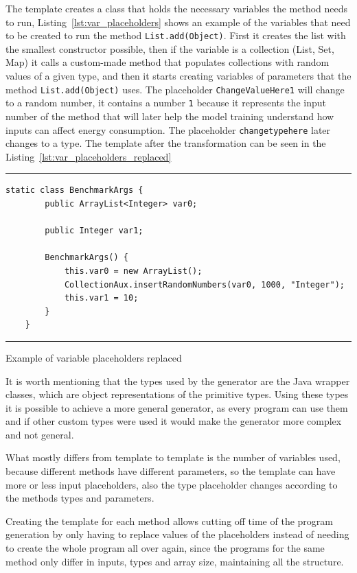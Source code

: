 The template creates a class that holds the necessary variables the method needs to run, Listing~\ref{lst:var_placeholders} shows an example of the variables that need to be created to run the method \texttt{List.add(Object)}. First it creates the list with the smallest constructor possible, then if the variable is a collection (List, Set, Map) it calls a custom-made method that populates collections with random values of a given type, and then it starts creating variables of parameters that the method \texttt{List.add(Object)} uses. The placeholder \texttt{ChangeValueHere1} will change to a random number, it contains a number \texttt{1} because it represents the input number of the method that will later help the model training understand how inputs can affect energy consumption. The placeholder \texttt{changetypehere} later changes to a type. The template after the transformation can be seen in the Listing~\ref{lst:var_placeholders_replaced}


\begin{listing}[H]
\noindent\rule{\linewidth}{0.4pt}
\begin{verbatim}
static class BenchmarkArgs {
        public ArrayList<Integer> var0;

        public Integer var1;

        BenchmarkArgs() {
            this.var0 = new ArrayList();
            CollectionAux.insertRandomNumbers(var0, 1000, "Integer");
            this.var1 = 10;
        }
    }
\end{verbatim}
\noindent\rule{\linewidth}{0.4pt}
\caption{Example of variable placeholders replaced}            
\label{lst:var_placeholders_replaced}
\end{listing}


It is worth mentioning that the types used by the generator are the Java wrapper classes, which are object representations of the primitive types. Using these types it is possible to achieve a more general generator, as every program can use them and if other custom types were used it would make the generator more complex and not general.

What mostly differs from template to template is the number of variables used, because different methods have different parameters, so the template can have more or less input placeholders, also the type placeholder changes according to the methods types and parameters.


Creating the template for each method allows cutting off time of the program generation by only having to replace values of the placeholders instead of needing to create the whole program all over again, since the programs for the same method only differ in inputs, types and array size, maintaining all the structure.

